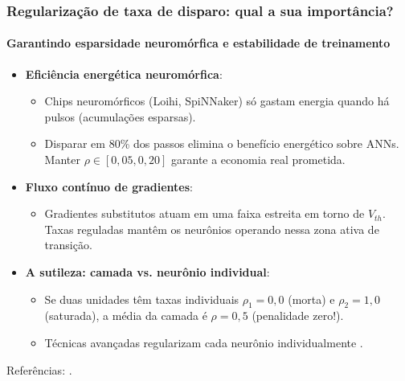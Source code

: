 \begin{frame}
	\frametitle{Regularização de taxa de disparo: qual a sua importância?}
	\framesubtitle{Garantindo esparsidade neuromórfica e estabilidade de treinamento}
	\small
	\begin{itemize}
		\setlength{\itemsep}{2pt}
		\item \textbf{Eficiência energética neuromórfica}:
		\begin{itemize}
			\item Chips neuromórficos (Loihi, SpiNNaker) só gastam energia quando há pulsos (acumulações esparsas).
			\item Disparar em 80\% dos passos elimina o benefício energético sobre ANNs. Manter $\rho \in [0{,}05, 0{,}20]$ garante a economia real prometida.
		\end{itemize}
		\item \textbf{Fluxo contínuo de gradientes}:
		\begin{itemize}
			\item Gradientes substitutos atuam em uma faixa estreita em torno de $V_{th}$. Taxas reguladas mantêm os neurônios operando nessa zona ativa de transição.
		\end{itemize}
		\item \textbf{A sutileza: camada vs. neurônio individual}:
		\begin{itemize}
			\item Se duas unidades têm taxas individuais $\rho_1 = 0{,}0$ (morta) e $\rho_2 = 1{,}0$ (saturada), a média da camada é $\rho = 0{,}5$ (penalidade zero!).
			\item Técnicas avançadas regularizam cada neurônio individualmente \cite{yan2022sparsity, eshraghian2023training}.
		\end{itemize}
	\end{itemize}
	\par\vfill{\tiny Referências: \cite{yan2022sparsity, eshraghian2023training}.}
\end{frame}
